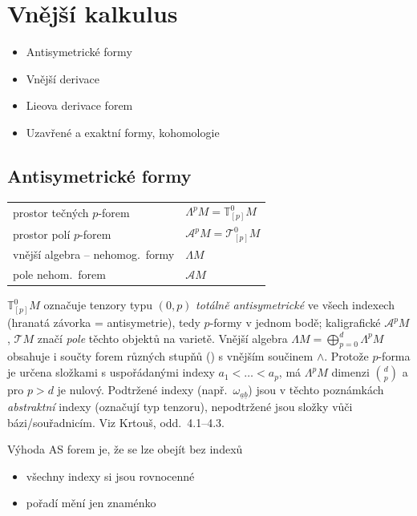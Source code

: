 \section{Vnější kalkulus}
\begin{itemize}[nosep]
  \item Antisymetrické formy
  \item Vnější derivace
  \item Lieova derivace forem
  \item Uzavřené a exaktní formy, kohomologie
\end{itemize}

\subsection{Antisymetrické formy}

\begin{tabular}{@{}ll}
prostor tečných $p$-forem & $\Lambda^p M = \mathbb{T}^0_{[p]}M$ \\
prostor polí $p$-forem & $\mathcal{A}^p M = \mathcal{T}^0_{[p]}M$ \\
vnější algebra -- nehomog.\ formy & $\Lambda M$ \\
pole nehom.\ forem & $\mathcal{A} M$
\end{tabular}

\begin{vysvetleni}
$\mathbb{T}^0_{[p]}M$ označuje tenzory typu $(0,p)$ \emph{totálně antisymetrické} ve všech indexech (hranatá závorka = antisymetrie), tedy $p$-formy v jednom bodě; kaligrafické $\mathcal{A}^pM$, $\mathcal{T}M$ značí \emph{pole} těchto objektů na varietě. Vnější algebra $\Lambda M=\bigoplus_{p=0}^{d}\Lambda^pM$ obsahuje i součty forem různých stupňů () s vnějším součinem $\wedge$. Protože $p$-forma je určena složkami s uspořádanými indexy $a_1<\dots<a_p$, má $\Lambda^pM$ dimenzi $\binom{d}{p}$ a pro $p>d$ je nulový.
Podtržené indexy (např.\ $\omega_{\underline{a}\underline{b}}$) jsou v těchto poznámkách \emph{abstraktní} indexy (označují typ tenzoru), nepodtržené jsou složky vůči bázi/souřadnicím.
Viz Krtouš, odd.~4.1--4.3.
\end{vysvetleni}

Výhoda AS forem je, že se lze obejít bez indexů
\begin{itemize}[nosep]
  \item[] všechny indexy si jsou rovnocenné
  \item[] pořadí mění jen znaménko
\end{itemize}

